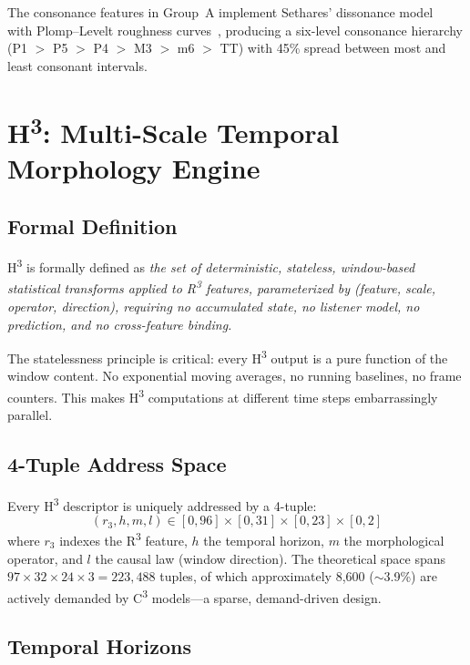 \documentclass[10pt,twocolumn]{article}
\newcommand{\Rcube}{R\textsuperscript{3}}
\newcommand{\Hcube}{H\textsuperscript{3}}
\newcommand{\Ccube}{C\textsuperscript{3}}
\begin{document}
The consonance features in Group~A implement Sethares' dissonance model~\cite{sethares1993} with Plomp--Levelt roughness curves~\cite{plomp1965}, producing a six-level consonance hierarchy (P1 $>$ P5 $>$ P4 $>$ M3 $>$ m6 $>$ TT) with 45\% spread between most and least consonant intervals.

\section{H\textsuperscript{3}: Multi-Scale Temporal Morphology Engine}
\label{sec:h3}

\subsection{Formal Definition}

\Hcube{} is formally defined as \emph{the set of deterministic, stateless, window-based statistical transforms applied to \Rcube{} features, parameterized by (feature, scale, operator, direction), requiring no accumulated state, no listener model, no prediction, and no cross-feature binding.}

The statelessness principle is critical: every \Hcube{} output is a pure function of the window content.
No exponential moving averages, no running baselines, no frame counters.
This makes \Hcube{} computations at different time steps embarrassingly parallel.

\subsection{4-Tuple Address Space}

Every \Hcube{} descriptor is uniquely addressed by a 4-tuple:
\begin{equation}
(r_3, h, m, l) \in [0,96] \times [0,31] \times [0,23] \times [0,2]
\label{eq:h3tuple}
\end{equation}
where $r_3$ indexes the \Rcube{} feature, $h$ the temporal horizon, $m$ the morphological operator, and $l$ the causal law (window direction).
The theoretical space spans $97 \times 32 \times 24 \times 3 = 223{,}488$ tuples, of which approximately 8,600 ($\sim$3.9\%) are actively demanded by \Ccube{} models---a sparse, demand-driven design.

\subsection{Temporal Horizons}
\end{document}
